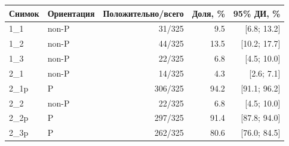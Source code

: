 \begin{tabular}{@{}llrrr@{}}
\toprule
Снимок & Ориентация & Положительно/всего & Доля, \% & 95\% ДИ, \% \\
\midrule
1\_1 & non-P & 31/325 & \num{9.5} & [\num{6.8}; \num{13.2}] \\
1\_2 & non-P & 44/325 & \num{13.5} & [\num{10.2}; \num{17.7}] \\
1\_3 & non-P & 22/325 & \num{6.8} & [\num{4.5}; \num{10.0}] \\
2\_1 & non-P & 14/325 & \num{4.3} & [\num{2.6}; \num{7.1}] \\
2\_1p & P & 306/325 & \num{94.2} & [\num{91.1}; \num{96.2}] \\
2\_2 & non-P & 22/325 & \num{6.8} & [\num{4.5}; \num{10.0}] \\
2\_2p & P & 297/325 & \num{91.4} & [\num{87.8}; \num{94.0}] \\
2\_3p & P & 262/325 & \num{80.6} & [\num{76.0}; \num{84.5}] \\
\bottomrule
\end{tabular}
